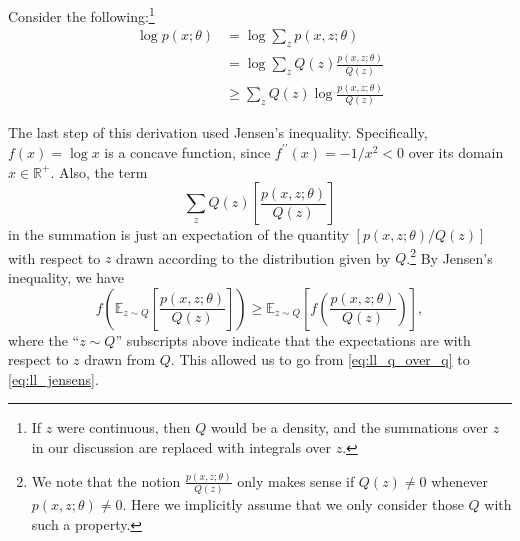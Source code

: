 Consider the following:\footnote{
If $z$ were continuous, then $Q$ would be a density, and the summations over $z$ in our
discussion are replaced with integrals over $z$.
}
\begin{align}
    \log p(x;\theta) &= \log \sum_{z} p(x,z;\theta)\\
        &= \log \sum_{z} Q(z) \frac{p(x,z;\theta)}{Q(z)}\label{eq:ll_q_over_q}\\
        &\ge \sum_{z} Q(z)\log\frac{p(x,z;\theta)}{Q(z)}\label{eq:ll_jensens}
\end{align}

The last step of this derivation used Jensen's inequality. Specifically,
$f(x) = \log x$ is a concave function, since $f^{\prime\prime}(x) = -1/x^2 < 0$ over its domain
$x \in \mathbb R^+$. Also, the term
\begin{equation*}
    \sum_{z} Q(z)\left[ \frac{p(x,z;\theta)}{Q(z)} \right]
\end{equation*}
in the summation is just an expectation of the quantity $[p(x,z;\theta)/Q(z)]$ with
respect to $z$ drawn according to the distribution given by $Q$.\footnote{
We note that the notion $\frac{p(x,z;\theta)}{Q(z)}$
only makes sense if $Q(z) \ne 0$ whenever $p(x,z;\theta) \ne 0$.
Here we implicitly assume that we only consider those $Q$ with such a property.    
} By Jensen's inequality, we have
\begin{equation*}
    f \left(\mathbb E_{z \sim Q}\left[ \frac{p(x,z;\theta)}{Q(z)}\right]\right) \ge \mathbb E_{z \sim Q} \left[f\left( \frac{p(x,z;\theta)}{Q(z)}\right)\right],
\end{equation*}
where the ``$z \sim Q$'' subscripts above indicate that the expectations are with
respect to $z$ drawn from $Q$. This allowed us to go from \cref{eq:ll_q_over_q} to
\cref{eq:ll_jensens}.

